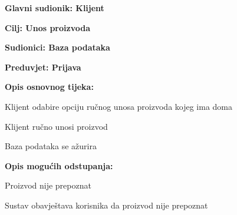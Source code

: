 					
				\noindent {}
					\begin{packed_item}
	
						\item \textbf{Glavni sudionik: Klijent}
						\item  \textbf{Cilj: Unos proizvoda }
						\item  \textbf{Sudionici: Baza podataka}
						\item  \textbf{Preduvjet: Prijava } 
						\item  \textbf{Opis osnovnog tijeka:}
						
						\item[] \begin{packed_enum}
	
							\item Klijent odabire opciju ručnog unosa proizvoda kojeg ima doma
							\item Klijent ručno unosi proizvod
							\item Baza podataka se ažurira
						\end{packed_enum}

					\item  \textbf{Opis mogućih odstupanja:}
						
						\item[] \begin{packed_item}
	
							\item[2.a] Proizvod nije prepoznat
							\item[] \begin{packed_enum}
								
								\item Sustav obavještava korisnika da proizvod nije prepoznat
							\end{packed_enum}
						\end{packed_item}
					\end{packed_item}
					
